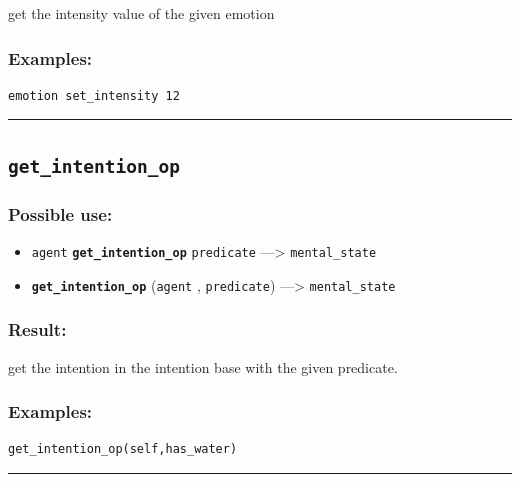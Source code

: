 \documentclass[]{book}
\providecommand{\tightlist}{%
  \setlength{\itemsep}{0pt}\setlength{\parskip}{0pt}}
\theoremstyle{definition}
\theoremstyle{definition}
\theoremstyle{definition}
\theoremstyle{remark}
\begin{document}
get the intensity value of the given emotion

\subsubsection{Examples:}\label{examples-160}

\begin{verbatim}
emotion set_intensity 12 
\end{verbatim}

\begin{center}\rule{0.5\linewidth}{\linethickness}\end{center}

\subsection{\texorpdfstring{\texttt{get\_intention\_op}}{get\_intention\_op}}\label{get_intention_op}

\subsubsection{Possible use:}\label{possible-use-214}

\begin{itemize}
\tightlist
\item
  \texttt{agent} \textbf{\texttt{get\_intention\_op}} \texttt{predicate}
  ---\textgreater{} \texttt{mental\_state}
\item
  \textbf{\texttt{get\_intention\_op}} (\texttt{agent} ,
  \texttt{predicate}) ---\textgreater{} \texttt{mental\_state}
\end{itemize}

\subsubsection{Result:}\label{result-208}

get the intention in the intention base with the given predicate.

\subsubsection{Examples:}\label{examples-161}

\begin{verbatim}
get_intention_op(self,has_water) 
\end{verbatim}

\begin{center}\rule{0.5\linewidth}{\linethickness}\end{center}
\end{document}
